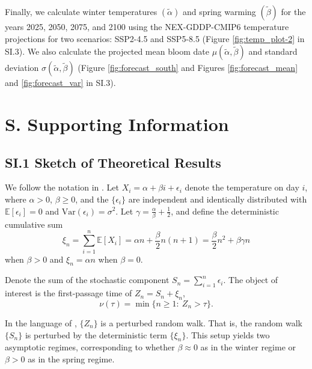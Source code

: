 \documentclass[
]{article}
\begin{document}
{Finally, we calculate winter temperatures $(\tilde \alpha)$ and spring warming $(\tilde \beta)$ for the years 2025, 2050, 2075, and 2100 using the NEX-GDDP-CMIP6 temperature projections for two scenarios: SSP2-4.5 and SSP5-8.5 \citep{thrasher2022nasa} (Figure \ref{fig:temp_plot-2} in SI.3). We also calculate the projected mean bloom date $ \mu(\tilde \alpha,\tilde \beta)$ and standard deviation $\sigma(\tilde \alpha, \tilde \beta)$ (Figure \ref{fig:forecast_south} and Figures \ref{fig:forecast_mean} and \ref{fig:forecast_var} in SI.3).




\onecolumn

\section{S. Supporting Information}\label{s.-appendix}

\setcounter{figure}{0}
\renewcommand{\thefigure}{S\arabic{figure}}

\setcounter{table}{0}
\renewcommand{\thetable}{S\arabic{table}}


\subsection{SI.1 Sketch of Theoretical
Results}\label{s.1-sketch-of-theoretical-results}

We follow the notation in \cite{gut2009stopped}. Let
\(X_i=\alpha+\beta i + \epsilon_i\) denote the temperature on day \(i\),
where \(\alpha>0\), \(\beta\ge 0\), and the \( \{\epsilon_i\} \) are 
independent and identically distributed with  
\(\mathbb{E}[\epsilon_i]=0\) and 
\(\mathrm{Var}(\epsilon_i)=\sigma^2\). Let \(\gamma=\frac{\alpha}{\beta}+\frac{1}{2}\), and
define the deterministic
cumulative sum \[
\xi_n=\sum_{i=1}^n \mathbb{E}[X_i]
=
\alpha n+\frac{\beta}{2}n(n+1)
=
\frac{\beta}{2}n^2+\beta\gamma n\]
when \(\beta>0\) and \(\xi_n=\alpha n\) when \(\beta=0\). 

Denote the sum of the
stochastic component \(S_n=\sum_{i=1}^n \epsilon_i\). The object of
interest is the first-passage time of \( Z_n=S_n+\xi_n\), \[
\nu(\tau)=\min\{n\ge 1:\ Z_n> \tau\}.
\] 

In the language of \cite{lai1977nonlinear}, \(\{Z_n\}\) is a
perturbed random walk. That is, the random walk \(\{S_n\}\) is perturbed by the
deterministic term \(\{\xi_n\}\). This setup yields two
asymptotic regimes, corresponding to whether \(\beta\approx 0\) as in the winter regime or 
\(\beta>0\) as in the spring regime.

}
\end{document}
